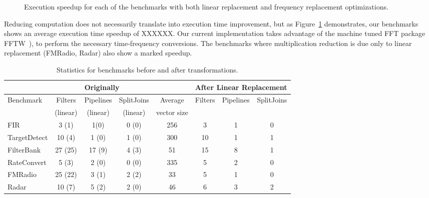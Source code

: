 \begin{figure}
\center
\epsfxsize=3.2in
\vspace{-6pt}
\caption{Execution speedup for each of the benchmarks with both linear replacement and frequency replacement optimizations.}
\label{fig:execution-speedup}
\vspace{-12pt}
\end{figure}

Reducing computation does not necessarily translate into execution time improvement, but as
Figure~\ref{fig:execution-speedup} demonstrates, our benchmarks shows an average execution time speedup of XXXXXX.
Our current implementation takes advantage of the machine tuned 
FFT package FFTW~\cite{frigo99fast}), to perform the necessary time-frequency conversions. 
The benchmarks where multiplication reduction is due only to linear replacement (FMRadio, Radar) 
also show a marked speedup.



\begin{table*}[t]
\centering
\small
\begin{tabular}{|l|c|c|c||c||c|c|c|} 
\hline
          & \multicolumn{3}{|c||}{Originally}  &             & \multicolumn{3}{|c|}{After Linear Replacement} \\
\hline
Benchmark & Filters & Pipelines & SplitJoins & Average     & Filters      & Pipelines         & SplitJoins \\
          & (linear)& (linear)  & (linear)   & vector size &              &                   &            \\
\hline
FIR       & 3 (1)  & 1(0)      & 0 (0)      & 256         & 3            & 1                 & 0 \\
\hline
TargetDetect & 10 (4)& 1 (0)    & 1 (0)      & 300         & 10           & 1                 & 1 \\
\hline
FilterBank & 27 (25) & 17 (9)   & 4 (3)      & 51          & 15           & 8                 & 1 \\
\hline
RateConvert& 5 (3)   & 2 (0)    & 0 (0)      & 335         & 5            & 2                 & 0 \\
\hline
FMRadio    & 25 (22) & 3 (1)    & 2 (2)      & 33          & 5            & 1                 & 0 \\
\hline
Radar      & 10 (7) & 5 (2)     & 2 (0)      & 46          & 6            & 3                 & 2 \\
\hline
\end{tabular}
\caption{Statistics for benchmarks before and after transformations.}
\label{fig:benchmark-statistics}
\end{table*}
